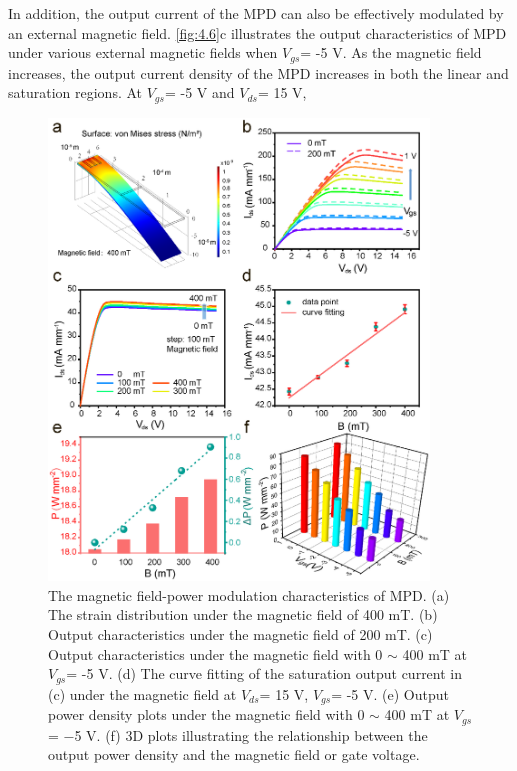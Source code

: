 In  addition, the output  current of the MPD can also be effectively modulated by an external magnetic field. \autoref{fig:4.6}c illustrates the output characteristics of MPD under various external magnetic fields when $V_{gs}$= -5 \unit{\V}. As the magnetic field increases, the output current density of the MPD increases in both the linear and saturation regions. At $V_{gs}$= -5 \unit{\V} and $V_{ds}$= 15 \unit{\V},

\begin{figure}[H] 
\centering    
\includegraphics[width=0.9\textwidth]{ch4_6}
\caption[The magnetic field-power modulation characteristics of MPD]{The  magnetic field-power modulation characteristics of MPD. (a) The strain distribution under the magnetic field of 400 \unit{\milli\tesla}. (b) Output  characteristics under the magnetic field of 200 \unit{\milli\tesla}. (c) Output  characteristics under the magnetic field with 0 $\sim$ 400 \unit{\milli\tesla} at $V_{gs}$= -5 \unit{\V}. (d) The curve fitting of the saturation output current in (c) under the magnetic field at $V_{ds}$= 15 \unit{\V}, $V_{gs}$= -5 \unit{\V}. (e) Output power density plots under the magnetic field with 0 $\sim$ 400 \unit{\milli\tesla} at $V_{gs}$= −5 \unit{\V}. (f) 3D plots illustrating the relationship between the output power density and the magnetic field or gate voltage.}
\label{fig:4.6}
\end{figure}

